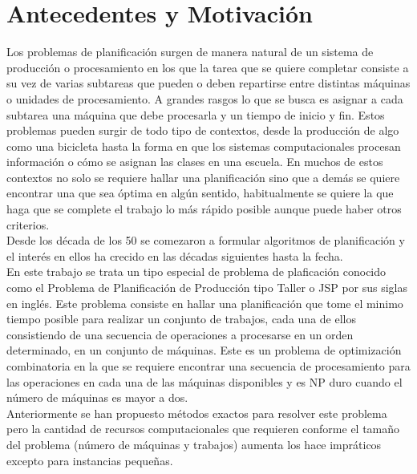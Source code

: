 \section{Antecedentes y Motivación}
Los problemas de planificación surgen de manera natural de un sistema de producción o procesamiento en los que la tarea que se quiere completar consiste a su vez de varias subtareas que pueden o deben repartirse entre distintas máquinas o unidades de procesamiento. A grandes rasgos lo que se busca es asignar a cada subtarea una máquina que debe procesarla y un tiempo de inicio y fin.  Estos problemas pueden surgir de todo tipo de contextos, desde la producción de algo como una bicicleta hasta la forma en que los sistemas computacionales procesan información o cómo se asignan las clases en una escuela. En muchos de estos contextos no solo se requiere hallar una planificación sino que a demás se quiere encontrar una que sea óptima en algún sentido, habitualmente se quiere la que haga que se complete el trabajo lo más rápido posible aunque puede haber otros criterios.\\
Desde los década de los 50 se comezaron a formular algoritmos de planificación\cite{johnson1954optimal} y el interés en ellos ha crecido en las décadas siguientes hasta la fecha.\\ 
 
En este trabajo se trata un tipo especial de problema de plaficación conocido como el Problema de Planificación de Producción tipo Taller o JSP por sus siglas en inglés. Este problema consiste en hallar una planificación que tome el minimo tiempo posible para realizar un conjunto de trabajos, cada una de ellos consistiendo de una secuencia de operaciones a procesarse en un orden determinado, en un conjunto de máquinas. Este es un problema de optimización combinatoria en la que se requiere encontrar una secuencia de procesamiento para las operaciones en cada una de las máquinas disponibles y es NP duro cuando el número de máquinas es mayor a dos.\\

Anteriormente se han propuesto métodos exactos para resolver este problema \cite{Brucker1994} pero la cantidad de recursos computacionales que requieren conforme el tamaño del problema (número de máquinas y trabajos) aumenta los hace impráticos excepto para instancias pequeñas.


